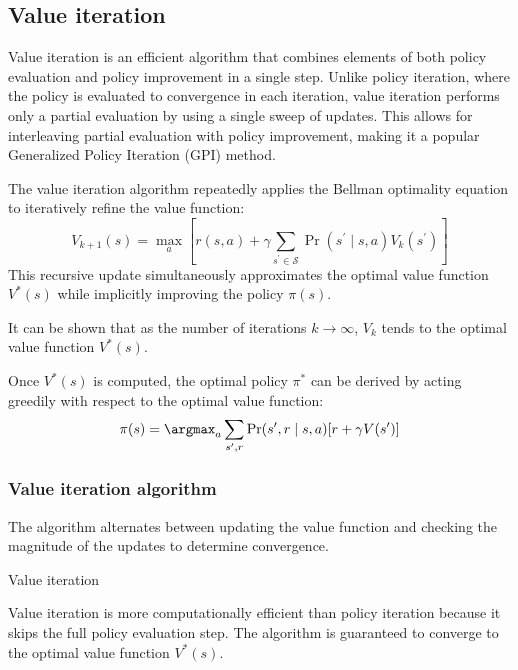 \subsection{Value iteration}
Value iteration is an efficient algorithm that combines elements of both policy evaluation and policy improvement in a single step.
Unlike policy iteration, where the policy is evaluated to convergence in each iteration, value iteration performs only a partial evaluation by using a single sweep of updates. 
This allows for interleaving partial evaluation with policy improvement, making it a popular Generalized Policy Iteration (GPI) method.

The value iteration algorithm repeatedly applies the Bellman optimality equation to iteratively refine the value function:
\[V_{k+1}(s)=\max_a\left[r(s,a)+\gamma\sum_{s^\prime\in\mathcal{S}}\Pr(s^\prime\mid s,a)V_k(s^\prime)\right]\]
This recursive update simultaneously approximates the optimal value function $V^\ast(s)$ while implicitly improving the policy $\pi(s)$. 

It can be shown that as the number of iterations $k\rightarrow \infty$, $V_k$ tends to the optimal value function $V^\ast(s)$. 

Once $V^\ast(s)$ is computed, the optimal policy $\pi^\ast$ can be derived by acting greedily with respect to the optimal value function:
\[\pi(s)=\argmax_a\sum_{s^\prime,r}\Pr(s^\prime,r\mid s,a)[r+\gamma V(s^\prime)]\]


\subsubsection{Value iteration algorithm}
The algorithm alternates between updating the value function and checking the magnitude of the updates to determine convergence.
\begin{algorithm}[H]
    \caption{Value iteration}
        \begin{algorithmic}[1]
            \Repeat 
                \EndFor
            \Until{$\Delta<\theta$}
        \end{algorithmic}
\end{algorithm}
Value iteration is more computationally efficient than policy iteration because it skips the full policy evaluation step.
The algorithm is guaranteed to converge to the optimal value function $V^\ast(s)$. 

